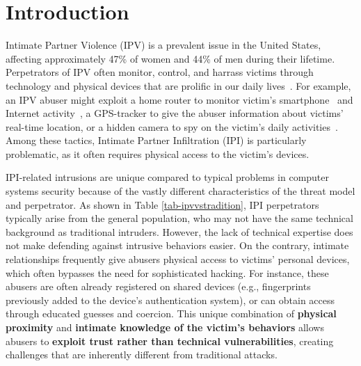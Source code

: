 \section{Introduction}

Intimate Partner Violence (IPV) is a prevalent issue in the United States, affecting approximately 47\% of women and 44\% of men during their lifetime\cite{leemis2022nisvs}. Perpetrators of IPV often monitor, control, and harrass victims through technology and physical devices that are prolific in our daily lives~\cite{ceccio2023sneaky,rogers2023technology,freed2018stalker,bellini2023digital}. For example, an IPV abuser might exploit a home router to monitor victim's smartphone~\cite{tseng2020tools} and Internet activity~\cite{freed2018stalker}, a GPS-tracker to give the abuser information about victims' real-time location, or a hidden camera to spy on the victim's daily activities~\cite{ceccio2023sneaky}.    Among these tactics, Intimate Partner Infiltration (IPI) is particularly problematic, as it often requires physical access to the victim's devices.




IPI-related intrusions are unique compared to typical problems in computer systems security because of the vastly different characteristics of the threat model and perpetrator. As shown in Table \ref{tab-ipvvstradition}, IPI perpetrators typically arise from the general population, who may not have the same technical background as traditional intruders. However, the lack of technical expertise does not make defending against intrusive behaviors easier. On the contrary, intimate relationships frequently give abusers physical access to victims' personal devices, which often bypasses the need for sophisticated hacking. For instance, these abusers are often already registered on shared devices (e.g., fingerprints previously added to the device's authentication system), or can obtain access through educated guesses and coercion. This unique combination of \textbf{physical proximity} and \textbf{intimate knowledge of the victim's behaviors} allows abusers to \textbf{exploit trust rather than technical vulnerabilities}, creating challenges that are inherently different from traditional attacks.



